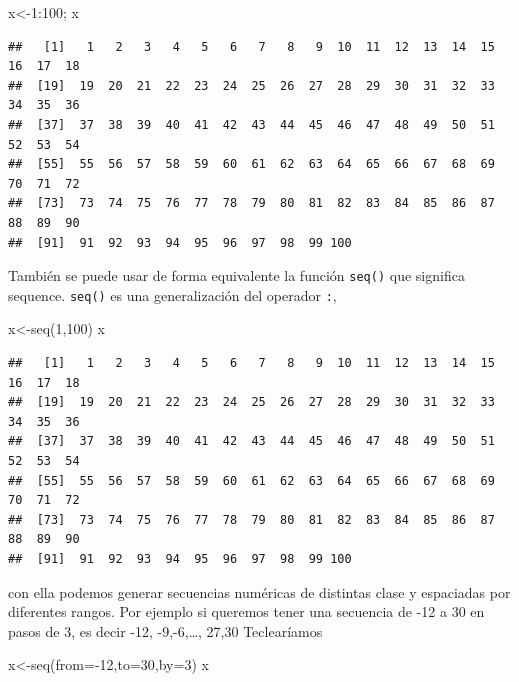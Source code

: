 \documentclass[
]{book}
\newenvironment{Shaded}{\begin{snugshade}}{\end{snugshade}}
\newcommand{\AttributeTok}[1]{\textcolor[rgb]{0.77,0.63,0.00}{#1}}
\newcommand{\DecValTok}[1]{\textcolor[rgb]{0.00,0.00,0.81}{#1}}
\newcommand{\FunctionTok}[1]{\textcolor[rgb]{0.00,0.00,0.00}{#1}}
\newcommand{\NormalTok}[1]{#1}
\newcommand{\OtherTok}[1]{\textcolor[rgb]{0.56,0.35,0.01}{#1}}
\newcommand{\SpecialCharTok}[1]{\textcolor[rgb]{0.00,0.00,0.00}{#1}}
\begin{document}
\begin{Shaded}
\begin{Highlighting}[]
\NormalTok{x}\OtherTok{\textless{}{-}}\DecValTok{1}\SpecialCharTok{:}\DecValTok{100}\NormalTok{;}
\NormalTok{x}
\end{Highlighting}
\end{Shaded}

\begin{verbatim}
##   [1]   1   2   3   4   5   6   7   8   9  10  11  12  13  14  15  16  17  18
##  [19]  19  20  21  22  23  24  25  26  27  28  29  30  31  32  33  34  35  36
##  [37]  37  38  39  40  41  42  43  44  45  46  47  48  49  50  51  52  53  54
##  [55]  55  56  57  58  59  60  61  62  63  64  65  66  67  68  69  70  71  72
##  [73]  73  74  75  76  77  78  79  80  81  82  83  84  85  86  87  88  89  90
##  [91]  91  92  93  94  95  96  97  98  99 100
\end{verbatim}

También se puede usar de forma equivalente la función \texttt{seq()} que significa sequence. \texttt{seq()} es una generalización del operador \texttt{:},

\begin{Shaded}
\begin{Highlighting}[]
\NormalTok{x}\OtherTok{\textless{}{-}}\FunctionTok{seq}\NormalTok{(}\DecValTok{1}\NormalTok{,}\DecValTok{100}\NormalTok{)}
\NormalTok{x}
\end{Highlighting}
\end{Shaded}

\begin{verbatim}
##   [1]   1   2   3   4   5   6   7   8   9  10  11  12  13  14  15  16  17  18
##  [19]  19  20  21  22  23  24  25  26  27  28  29  30  31  32  33  34  35  36
##  [37]  37  38  39  40  41  42  43  44  45  46  47  48  49  50  51  52  53  54
##  [55]  55  56  57  58  59  60  61  62  63  64  65  66  67  68  69  70  71  72
##  [73]  73  74  75  76  77  78  79  80  81  82  83  84  85  86  87  88  89  90
##  [91]  91  92  93  94  95  96  97  98  99 100
\end{verbatim}

con ella podemos generar secuencias numéricas de distintas clase y espaciadas por diferentes rangos. Por ejemplo si queremos tener una secuencia de -12 a 30 en pasos de 3, es decir -12, -9,-6,\ldots, 27,30
Teclearíamos

\begin{Shaded}
\begin{Highlighting}[]
\NormalTok{x}\OtherTok{\textless{}{-}}\FunctionTok{seq}\NormalTok{(}\AttributeTok{from=}\SpecialCharTok{{-}}\DecValTok{12}\NormalTok{,}\AttributeTok{to=}\DecValTok{30}\NormalTok{,}\AttributeTok{by=}\DecValTok{3}\NormalTok{)}
\NormalTok{x}
\end{Highlighting}
\end{Shaded}
\end{document}

